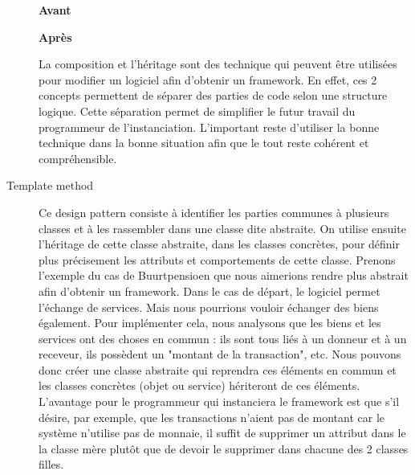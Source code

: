 \begin{description}
\vspace{0.3cm}
\begin{minipage}{.5\textwidth}
\begin{center} \textbf{Avant}

\end{center}
\end{minipage}
\hspace{0.3cm}
\begin{minipage}{.5\textwidth}
\begin{center} \textbf{Après}\end{center}


\end{minipage}
\vspace{0.3cm}

La composition et l'héritage sont des technique qui peuvent être utilisées pour modifier un logiciel afin d'obtenir un framework.  En effet,  ces 2 concepts permettent de séparer des parties de code selon une structure logique.  Cette séparation permet de simplifier le futur travail du programmeur de l'instanciation.  L'important reste d'utiliser la bonne technique dans la bonne situation afin que le tout reste cohérent et compréhensible.  


\item[Template method]
Ce design pattern consiste à identifier les parties communes à plusieurs classes et à les rassembler dans une classe dite abstraite.  On utilise ensuite l'héritage de cette classe abstraite,  dans les classes concrètes,  pour définir plus précisement les attributs et comportements de cette classe.  Prenons l'exemple du cas de Buurtpensioen que nous aimerions rendre plus abstrait afin d'obtenir un framework.  Dans le cas de départ,  le logiciel permet l'échange de services.  Mais nous pourrions vouloir échanger des biens également.  Pour implémenter cela,  nous analysons que les biens et les services ont des choses en commun : ils sont tous liés à un donneur et à un receveur,  ils possèdent un "montant de la transaction",  etc.  Nous pouvons donc créer une classe abstraite qui reprendra ces éléments en commun et les classes concrètes (objet ou service) hériteront de ces éléments.  L'avantage pour le programmeur qui instanciera le framework est que s'il désire,  par exemple,  que les transactions n'aient pas de montant car le système n'utilise pas de monnaie,  il suffit de supprimer un attribut dans le la classe mère plutôt que de devoir le supprimer dans chacune des 2 classes filles.




\end{description}
